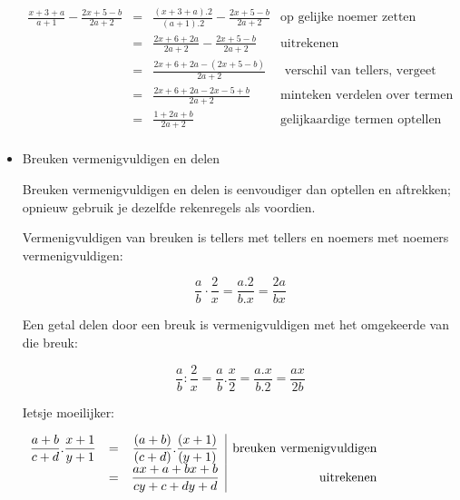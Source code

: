 \begin{itemize}
	\begin{math}
	\begin{array}{ccl|r}
	{\displaystyle \frac{x+3+a}{a+1}-\frac{2x+5-b}{2a+2}} & = & {\displaystyle \frac{(x+3+a).2}{(a+1).2}-\frac{2x+5-b}{2a+2}}  & \text{op gelijke noemer zetten}\\
	& = & {\displaystyle \frac{2x+6+2a}{2a+2}-\frac{2x+5-b}{2a+2}} &\text{uitrekenen}\\
	& = & {\displaystyle \frac{2x+6+2a-(2x+5-b)}{2a+2}} & \text{ verschil van tellers, vergeet geen haken!}\\
	& = & {\displaystyle \frac{2x+6+2a-2x-5+b}{2a+2}} & \text{minteken verdelen over termen}\\
	& = & {\displaystyle \frac{1+2a+b}{2a+2}} & \text{gelijkaardige termen optellen}\\
	\end{array}
	\end{math}
	
	
	\item{Breuken vermenigvuldigen en delen}
	
	Breuken vermenigvuldigen en delen is eenvoudiger dan optellen en aftrekken;
	opnieuw gebruik je dezelfde rekenregels als voordien. 
	
	\noindent Vermenigvuldigen van breuken is tellers met tellers en noemers
	met noemers vermenigvuldigen:
	
	\begin{equation*}
		{\displaystyle \frac{a}{b}\cdot\frac{2}{x}=\frac{a.2}{b.x}=\frac{2a}{bx}} 
	\end{equation*}
	
	\noindent Een getal delen door een breuk is vermenigvuldigen met het
	omgekeerde van die breuk:
	
	\begin{equation*}
		{\displaystyle \frac{a}{b}:\frac{2}{x}=\frac{a}{b}.\frac{x}{2}=\frac{a.x}{b.2}=\frac{ax}{2b}}
	\end{equation*}	
	
	\noindent Ietsje moeilijker:
	
	\begin{math}
		\centering
	\begin{array}{ccc|r}
	{\displaystyle \frac{a+b}{c+d}.\frac{x+1}{y+1}} & = & {\displaystyle \frac{(a+b)}{(c+d)}.\frac{(x+1)}{(y+1)}} & \text{breuken vermenigvuldigen}\\
	& = & {\displaystyle \frac{ax+a+bx+b}{cy+c+dy+d}} & \text{uitrekenen}\\
	\end{array}
	\end{math}
	

\end{itemize}
